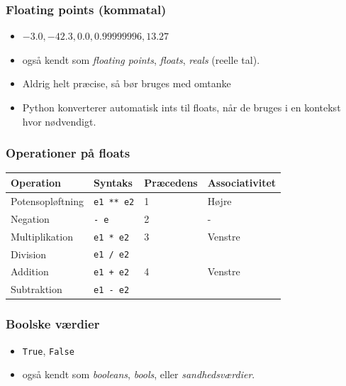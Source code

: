 \documentclass[10pt]{beamer}
\begin{document}
\begin{frame}
  \frametitle{Floating points (kommatal)}

  \begin{itemize}
  \item $-3.0, -42.3, 0.0, 0.99999996, 13.27$
  \item også kendt som \textit{floating points}, \textit{floats},
    \textit{reals} (reelle tal).
  \item Aldrig helt præcise, så bør bruges med omtanke
  \item Python konverterer automatisk ints til floats, når de bruges i
    en kontekst hvor nødvendigt.
  \end{itemize}
  
\end{frame}

\begin{frame}
  \frametitle{Operationer på floats}
    \begin{tabular}{llll}
    \toprule
    \textbf{Operation} & \textbf{Syntaks} & \textbf{Præcedens} & \textbf{Associativitet} \\
    \toprule
    Potensopløftning & \texttt{e1 ** e2} & 1 & Højre \\ \midrule
    Negation & \texttt{- e} & 2 & - \\
    \midrule
    Multiplikation & \texttt{e1 * e2} & 3 & Venstre\\
    Division & \texttt{e1 / e2} & &\\
    \midrule
    Addition & \texttt{e1 + e2} & 4 & Venstre\\
    Subtraktion & \texttt{e1 - e2} & & \\
    \bottomrule
  \end{tabular}
\end{frame}

\begin{frame}
  \frametitle{Boolske værdier}

  \begin{itemize}
  \item \texttt{True}, \texttt{False}
  \item også kendt som \textit{booleans}, \textit{bools}, eller
    \textit{sandhedsværdier}.
  \end{itemize}

  
\end{frame}
\end{document}

